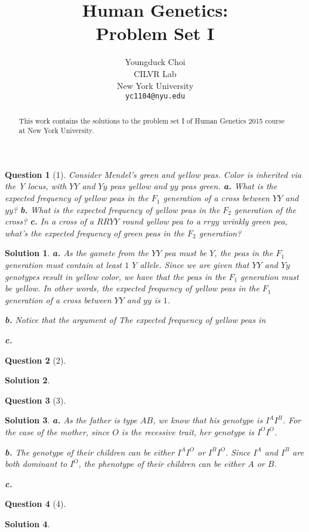 \documentclass{article} %
\title{Human Genetics: \\
Problem Set I}
\author{
Youngduck Choi \\
CILVR Lab \\
New York University\\
\texttt{yc1104@nyu.edu} \\
}
\theoremstyle{quest}
\newtheorem*{question}{Question}
\newtheorem*{solution}{Solution}
\begin{document}
\maketitle

\begin{abstract}
This work contains the solutions to the problem set I
of Human Genetics 2015 course at New York University.
\end{abstract}

\begin{question}[1] 
Consider Mendel's green and yellow peas. Color is inherited via the Y locus,
with $YY$ and $Yy$ peas yellow and $yy$ peas green. \textbf{a.} What is the
expected frequency of yellow peas in the $F_1$ generation of a cross between
$YY$ and $yy$? \textbf{b.} What is the expected frequency of yellow peas
in the $F_2$ generation of the cross? \textbf{c.} In a cross of a $RRYY$ round
yellow pea to a $rryy$ wrinkly green pea, what's the expected frequency of
green peas in the $F_2$ generation?
\end{question}

\smallskip

\begin{solution}
\textbf{a.} As the gamete from the $YY$ pea must be $Y$, the peas in the $F_1$ generation
must contain at least $1$ $Y$ allele. Since we are given that $YY$ and $Yy$ genotypes result
in yellow color, we have that the peas in the $F_1$ generation must be yellow. In other words,
the expected frequency of yellow peas in the $F_1$ generation of a cross between $YY$ and $yy$
is $1$.

\smallskip

\textbf{b.} Notice that the argument of 
The expected frequency of yellow peas in 

\smallskip

\textbf{c.}

\smallskip

\end{solution}

\bigskip


\begin{question}[2]
\end{question}
\begin{solution}
\end{solution}

\bigskip

\begin{question}[3]
\end{question}
\begin{solution}
\textbf{a.} As the father is type $AB$, we know that his genotype is $I^A I^B$. For the case of the mother,
since $O$ is the recessive trait, her genotype is $I^O I^O$. \\

\smallskip

\textbf{b.} The genotype of their children can be either $I^A I^O$ or $I^B I^O$. Since 
$I^A$ and $I^B$ are both dominant to $I^O$, the phenotype of their children can be
either $A$ or $B$.
\smallskip

\textbf{c.}


\end{solution}

\bigskip

\begin{question}[4]
\end{question}
\begin{solution}
\end{solution}
\end{document}

